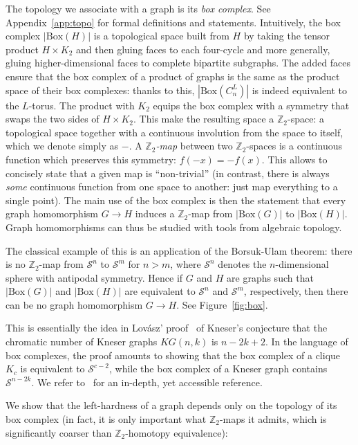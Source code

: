 \documentclass[11pt,a4paper]{scrartcl}
\numberwithin{theorem}{section}
\theoremstyle{definition}
\newcommand{\ZZ}{\mathbb{Z}}
\newcommand\Sphere{\mathcal{S}}
\newcommand\BBox[1]{\left|\mathrm{Box}(#1)\right|}
\begin{document}
The topology we associate with a graph is its \emph{box complex}.
See Appendix~\ref{app:topo} for formal definitions and statements.
Intuitively, the box complex $\BBox{H}$ is a topological space built from $H$ by taking the tensor product $H \times K_2$ and then gluing faces to each four-cycle and more generally, gluing higher-dimensional faces to complete bipartite subgraphs.
The added faces ensure that the box complex of a product of graphs is the same as the product space of their box complexes:
thanks to this, $\BBox{C_n^{L}}$ is indeed equivalent to the $L$-torus.
The product with $K_2$ equips the box complex with a symmetry that swaps the two sides of $H \times K_2$.
This make the resulting space a $\ZZ_2$-space: a topological space together with a continuous involution from the space to itself, which we denote simply as $-$.
A \emph{$\ZZ_2$-map} between two $\ZZ_2$-spaces is a continuous function which preserves this symmetry: $f(-x)=-f(x)$.
This allows to concisely state that a given map is ``non-trivial'' (in contrast, there is always \emph{some} continuous function from one space to another: just map everything to a single point).
The main use of the box complex is then the statement that every graph homomorphism $G \to H$ induces a $\ZZ_2$-map from $\BBox{G}$ to $\BBox{H}$.
Graph homomorphisms can thus be studied with tools from algebraic topology.

The classical example of this is an application of the Borsuk-Ulam theorem:
there is no $\ZZ_2$-map from $\Sphere^n$ to $\Sphere^m$ for $n > m$,
where $\Sphere^n$ denotes the $n$-dimensional sphere with antipodal symmetry.
Hence if $G$ and $H$ are graphs such that $\BBox{G}$ and $\BBox{H}$ are equivalent to $\Sphere^n$ and $\Sphere^m$, respectively,
then there can be no graph homomorphism $G\to H$.
See Figure~\ref{fig:box}.

This is essentially the idea in Lov\'{a}sz' proof~\cite{Lovasz78} of Kneser's conjecture that the chromatic number of Kneser graphs $KG(n,k)$ is $n-2k+2$.
In the language of box complexes, the proof amounts to showing that the box complex of a clique $K_c$ is equivalent to $\Sphere^{c-2}$,  while the box complex of a Kneser graph contains $\Sphere^{n-2k}$.
We refer to~\cite{matousek2008using} for an in-depth, yet accessible reference.

We show that the left-hardness of a graph depends only on the topology of its box complex (in fact, it is only important what $\ZZ_2$-maps it admits, which is significantly coarser than $\ZZ_2$-homotopy equivalence):
\end{document}
